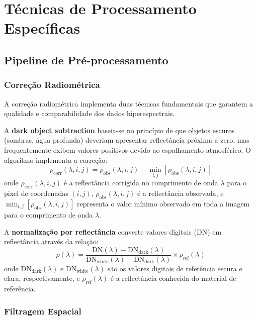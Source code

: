 \section{Técnicas de Processamento Específicas}\label{sec:tecnicas_processamento}

\subsection{Pipeline de Pré-processamento}\label{subsec:pipeline_preprocessamento}

\subsubsection{Correção Radiométrica}

A correção radiométrica implementa duas técnicas fundamentais que garantem 
a qualidade e comparabilidade dos dados hiperespectrais. 

A \textbf{dark object subtraction} baseia-se no princípio de que objetos 
escuros (sombras, água profunda) deveriam apresentar reflectância próxima a 
zero, mas frequentemente exibem valores positivos devido ao espalhamento 
atmosférico. O algoritmo implementa a correção:
\begin{equation}
\rho_{\text{corr}}(\lambda,i,j) = \rho_{\text{obs}}(\lambda,i,j) - \min_{i,j}[\rho_{\text{obs}}(\lambda,i,j)]
\label{eq:dark_object}
\end{equation}
onde $\rho_{\text{corr}}(\lambda,i,j)$ é a reflectância corrigida no comprimento 
de onda $\lambda$ para o pixel de coordenadas $(i,j)$, $\rho_{\text{obs}}(\lambda,i,j)$ 
é a reflectância observada, e $\min_{i,j}[\rho_{\text{obs}}(\lambda,i,j)]$ representa 
o valor mínimo observado em toda a imagem para o comprimento de onda $\lambda$.

A \textbf{normalização por reflectância} converte valores digitais (DN) em 
reflectância através da relação:
\begin{equation}
\rho(\lambda) = \frac{\text{DN}(\lambda) - \text{DN}_{\text{dark}}(\lambda)}{\text{DN}_{\text{white}}(\lambda) - \text{DN}_{\text{dark}}(\lambda)} \times \rho_{\text{ref}}(\lambda)
\label{eq:reflectance_norm}
\end{equation}
onde $\text{DN}_{\text{dark}}(\lambda)$ e $\text{DN}_{\text{white}}(\lambda)$ 
são os valores digitais de referência escura e clara, respectivamente, e 
$\rho_{\text{ref}}(\lambda)$ é a reflectância conhecida do material de referência.

\subsubsection{Filtragem Espacial}

